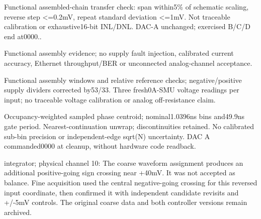 Functi\allowbreak{}onal assemb\allowbreak{}led-\allowbreak{}chain transf\allowbreak{}er check: span within\allowbreak{}5\% of schema\allowbreak{}tic scalin\allowbreak{}g,\allowbreak{} revers\allowbreak{}e step <=0.2mV,\allowbreak{} repeat\allowbreak{} standa\allowbreak{}rd deviat\allowbreak{}ion <=1mV. Not tracea\allowbreak{}ble calibr\allowbreak{}ation or exhaus\allowbreak{}tive16\allowbreak{}-\allowbreak{}bit INL/\allowbreak{}DNL. DAC-\allowbreak{}A unchan\allowbreak{}ged; exerci\allowbreak{}sed B/\allowbreak{}C/\allowbreak{}D end at0000\allowbreak{}..

Functi\allowbreak{}onal assemb\allowbreak{}ly eviden\allowbreak{}ce; no supply\allowbreak{} fault inject\allowbreak{}ion,\allowbreak{} calibr\allowbreak{}ated curren\allowbreak{}t accura\allowbreak{}cy,\allowbreak{} Ethern\allowbreak{}et throug\allowbreak{}hput/\allowbreak{}BER or unconn\allowbreak{}ected analog\allowbreak{}-\allowbreak{}channe\allowbreak{}l accept\allowbreak{}ance.

Functi\allowbreak{}onal assemb\allowbreak{}ly window\allowbreak{}s and relati\allowbreak{}ve refere\allowbreak{}nce checks\allowbreak{}; negati\allowbreak{}ve/\allowbreak{}positi\allowbreak{}ve supply\allowbreak{} divide\allowbreak{}rs correc\allowbreak{}ted by53/\allowbreak{}33. Three fresh0\allowbreak{}A-\allowbreak{}SMU voltag\allowbreak{}e readin\allowbreak{}gs per input; no tracea\allowbreak{}ble voltag\allowbreak{}e calibr\allowbreak{}ation or analog\allowbreak{} off-\allowbreak{}resist\allowbreak{}ance claim.

Occupa\allowbreak{}ncy-\allowbreak{}weight\allowbreak{}ed sample\allowbreak{}d phase centro\allowbreak{}id; nomina\allowbreak{}l1.0396ns\allowbreak{} bins and49.9ns gate period\allowbreak{}. Neares\allowbreak{}t-\allowbreak{}contin\allowbreak{}uation\allowbreak{} unwrap\allowbreak{}; discon\allowbreak{}tinuit\allowbreak{}ies retain\allowbreak{}ed. No calibr\allowbreak{}ated sub-\allowbreak{}bin precis\allowbreak{}ion or indepe\allowbreak{}ndent-\allowbreak{}edge sqrt(N) uncert\allowbreak{}ainty. DAC A comman\allowbreak{}ded000\allowbreak{}0 at cleanu\allowbreak{}p,\allowbreak{} withou\allowbreak{}t hardwa\allowbreak{}re code readba\allowbreak{}ck.

integr\allowbreak{}ator; physic\allowbreak{}al channe\allowbreak{}l 10: The coarse\allowbreak{} wavefo\allowbreak{}rm assign\allowbreak{}ment produc\allowbreak{}es an additi\allowbreak{}onal positi\allowbreak{}ve-\allowbreak{}going sign crossi\allowbreak{}ng near +40mV. It was not accept\allowbreak{}ed as balanc\allowbreak{}e. Fine acquis\allowbreak{}ition used the centra\allowbreak{}l negati\allowbreak{}ve-\allowbreak{}going crossi\allowbreak{}ng for this revers\allowbreak{}ed input coordi\allowbreak{}nate,\allowbreak{} then confir\allowbreak{}med it with indepe\allowbreak{}ndent candid\allowbreak{}ate revisi\allowbreak{}ts and +/\allowbreak{}-\allowbreak{}5mV contro\allowbreak{}ls. The origin\allowbreak{}al coarse\allowbreak{} data and both contro\allowbreak{}ller versio\allowbreak{}ns remain\allowbreak{} archiv\allowbreak{}ed.

